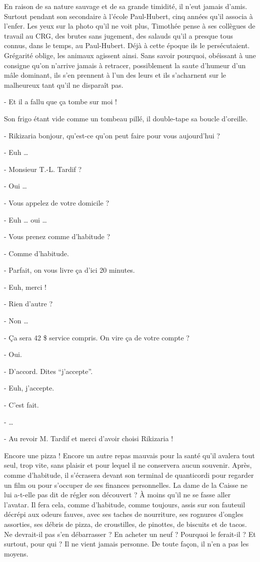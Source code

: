 En raison de sa nature sauvage et de sa grande timidité, il n’eut jamais d’amis. Surtout pendant son secondaire à l’école Paul-Hubert, cinq années qu’il associa à l’enfer. Les yeux sur la photo qu’il ne voit plus, Timothée pense à ses collègues de travail au CRG, des brutes sans jugement, des salauds qu’il a presque tous connus, dans le temps, au Paul-Hubert. Déjà à cette époque ils le persécutaient. Grégarité oblige, les animaux agissent ainsi. Sans savoir pourquoi, obéissant à une consigne qu’on n’arrive jamais à retracer, possiblement la saute d’humeur d’un mâle dominant, ils s’en prennent à l’un des leurs et ils s’acharnent sur le malheureux tant qu’il ne disparaît pas.

- Et il a fallu que ça tombe sur moi !

Son frigo étant vide comme un tombeau pillé, il double-tape sa boucle d’oreille.

- Rikizaria bonjour, qu’est-ce qu’on peut faire pour vous aujourd’hui ?

- Euh …

- Monsieur T.-L. Tardif ?

- Oui …

- Vous appelez de votre domicile ?

- Euh … oui …

- Vous prenez comme d’habitude ?

- Comme d’habitude.

- Parfait, on vous livre ça d’ici 20 minutes.

- Euh, merci !

- Rien d’autre ?

- Non …

- Ça sera 42 \$ service compris. On vire ça de votre compte ?

- Oui.

- D’accord. Dites “j’accepte”.

- Euh, j’accepte.

- C’est fait.

- …

- Au revoir M. Tardif et merci d’avoir choisi Rikizaria !

Encore une pizza ! Encore un autre repas mauvais pour la santé qu’il avalera tout seul, trop vite, sans plaisir et pour lequel il ne conservera aucun souvenir. Après, comme d’habitude, il s’écrasera devant son terminal de quanticordi pour regarder un film ou pour s’occuper de ses finances personnelles. La dame de la Caisse ne lui a-t-elle pas dit de régler son découvert ? À moins qu’il ne se fasse aller l’avatar. Il fera cela, comme d’habitude, comme toujours, assis sur son fauteuil décrépi aux odeurs fauves, avec ses taches de nourriture, ses rognures d’ongles assorties, ses débris de pizza, de croustilles, de pinottes, de biscuits et de tacos. Ne devrait-il pas s’en débarrasser ? En acheter un neuf ? Pourquoi le ferait-il ? Et surtout, pour qui ? Il ne vient jamais personne. De toute façon, il n’en a pas les moyens.

